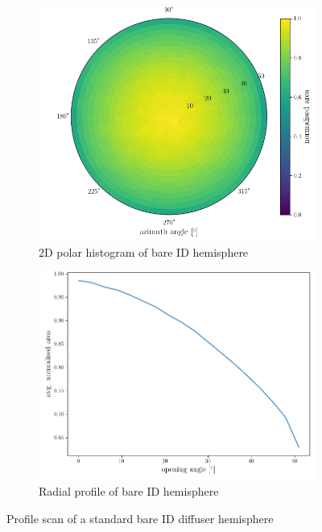 \documentclass[a4paper,11pt]{article}
\begin{document}
\begin{figure}[h]
  \centering
  \begin{subfigure}[b]{0.45\textwidth}
    \includegraphics[width=\linewidth]{b71_polar.png}
    \caption{2D polar histogram of bare ID hemisphere}
    \label{fig:bare polar}
  \end{subfigure}
  \hfill
  \begin{subfigure}[b]{0.45\textwidth}
    \includegraphics[width=\linewidth]{b71_radial.png}
    \caption{Radial profile of bare ID hemisphere}
    \label{fig:bare radial}
  \end{subfigure}
  \caption{Profile scan of a standard bare ID diffuser hemisphere}
  \label{fig:bare scan}
\end{figure}
\end{document}
